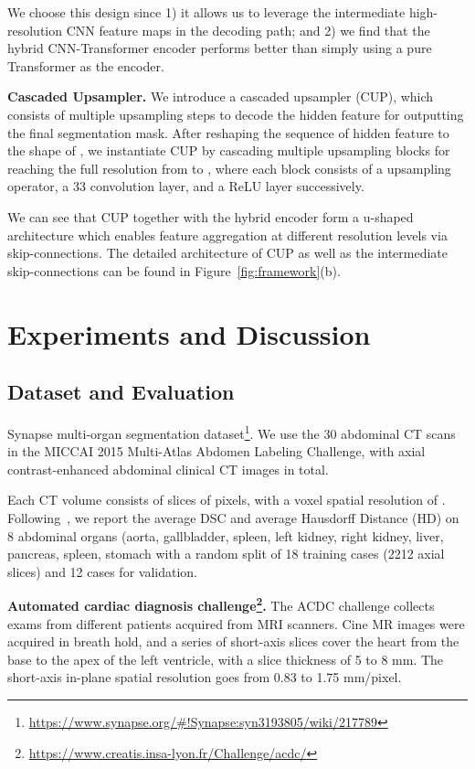 \documentclass[runningheads]{llncs}
\begin{document}
We choose this design since 1) it allows us to leverage the intermediate high-resolution CNN feature maps in the decoding path; and 2) we find that the hybrid CNN-Transformer encoder performs better than simply using a pure Transformer as the encoder.


\vspace{1ex}\noindent\textbf{Cascaded Upsampler.}
We introduce a cascaded upsampler (CUP), which consists of multiple upsampling steps to decode the hidden feature for outputting the final segmentation mask.
After reshaping the sequence of hidden feature  to  the shape of , we instantiate CUP by cascading multiple upsampling blocks for reaching the full resolution from   to , where each block consists of a  upsampling operator, a 33 convolution layer, and a ReLU layer successively.


We can see that CUP together with the hybrid encoder form a u-shaped architecture which enables feature aggregation at different resolution levels via skip-connections.
The detailed architecture of CUP as well as the intermediate skip-connections can be found in Figure~\ref{fig:framework}(b).


\section{Experiments and Discussion}
\subsection{Dataset and Evaluation}
Synapse multi-organ segmentation dataset\footnote{\url{https://www.synapse.org/\#!Synapse:syn3193805/wiki/217789}}.
We use the 30 abdominal CT scans in the MICCAI 2015 Multi-Atlas Abdomen Labeling Challenge, with  axial contrast-enhanced abdominal clinical CT images in total. 

Each CT volume consists of  slices of  pixels, with a voxel spatial resolution of . Following~\cite{fu2020domain}, we report the average DSC and average Hausdorff Distance (HD) on 8 abdominal organs (aorta, gallbladder, spleen, left kidney, right kidney, liver, pancreas, spleen, stomach with a random split of 18 training cases (2212 axial slices) and 12 cases for validation.


\noindent\textbf{Automated cardiac diagnosis challenge\footnote{\url{https://www.creatis.insa-lyon.fr/Challenge/acdc/}}.}   The ACDC challenge collects exams from different patients acquired from MRI scanners. Cine MR images were acquired in breath hold, and a series of short-axis slices cover the heart from the base to the apex of the left ventricle, with a slice thickness of 5 to 8 mm. The short-axis in-plane spatial resolution goes from 0.83 to 1.75 mm/pixel.
\end{document}

